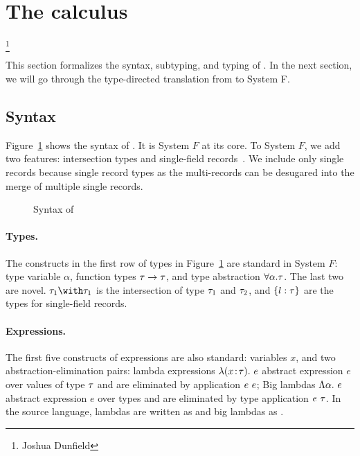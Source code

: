 \section{The \name calculus}


\footnote{Joshua Dunfield}

This section formalizes the syntax, subtyping, and typing of \name. In the next
section, we will go through the type-directed translation from \name to System
F.


\subsection{Syntax}

Figure~\ref{fig:fi-syntax} shows the syntax of \name. It is System $ F $ at its
core. To System $ F $, we add two features: intersection types and single-field
records~. We include
only single records because single record types as the multi-records can be
desugared into the merge of multiple single records.

\begin{figure}
  
  \caption{Syntax of \name}
  \label{fig:fi-syntax}
\end{figure}

\paragraph{Types.} The constructs in the first row of types in
Figure~\ref{fig:fi-syntax} are standard in System $ F $: type variable
$ \alpha $, function types $ \tau \to \tau $, and type abstraction
$ \forall \alpha. \tau $. The last two are novel. $ \ty_1 \intersects \ty_1 $ is
the intersection of type $ \tau_1 $ and $ \tau_2 $, 
and $ \{ l : \tau \} $ are the types for single-field records.

\paragraph{Expressions.} The first five constructs of expressions are also
standard: variables $ x $, and two abstraction-elimination pairs: lambda
expressions $ \lambda (x \!:\! \tau).~ e $ abstract expression $ e $ over values of
type $ \tau $ and are eliminated by application $ {e} ~ {e} $; Big lambdas
$ \Lambda \alpha.~ e $ abstract expression $ e $ over types and are eliminated by
type application $ {e} ~ {\tau} $. In the source language, lambdas are written as
 and big lambdas as .

